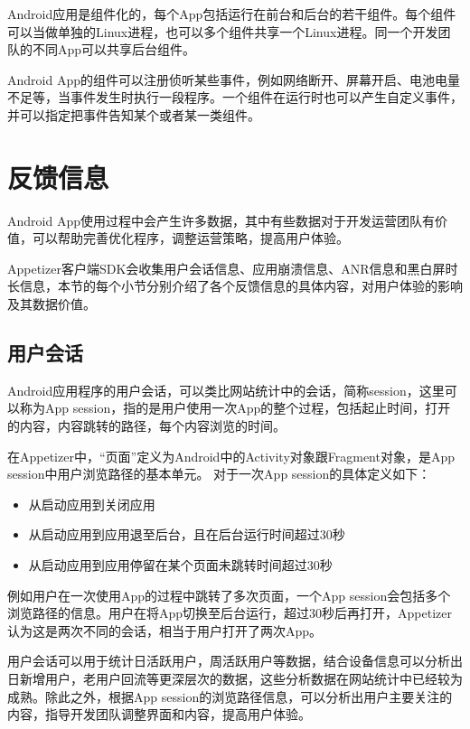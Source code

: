 Android应用是组件化的，每个App包括运行在前台和后台的若干组件。每个组件可以当做单独的Linux进程，也可以多个组件共享一个Linux进程。同一个开发团队的不同App可以共享后台组件。

Android App的组件可以注册侦听某些事件，例如网络断开、屏幕开启、电池电量不足等，当事件发生时执行一段程序。一个组件在运行时也可以产生自定义事件，并可以指定把事件告知某个或者某一类组件。

\section{反馈信息}
\label{sec:replyInfo}

Android App使用过程中会产生许多数据，其中有些数据对于开发运营团队有价值，可以帮助完善优化程序，调整运营策略，提高用户体验。

Appetizer客户端SDK会收集用户会话信息、应用崩溃信息、ANR信息和黑白屏时长信息，本节的每个小节分别介绍了各个反馈信息的具体内容，对用户体验的影响及其数据价值。

\subsection{用户会话}

Android应用程序的用户会话，可以类比网站统计中的会话，简称session，这里可以称为App session，指的是用户使用一次App的整个过程，包括起止时间，打开的内容，内容跳转的路径，每个内容浏览的时间。

在Appetizer中，“页面”定义为Android中的Activity对象跟Fragment对象，是App session中用户浏览路径的基本单元。
对于一次App session的具体定义如下：

\begin{itemize}
	\item 从启动应用到关闭应用
	\item 从启动应用到应用退至后台，且在后台运行时间超过30秒
	\item 从启动应用到应用停留在某个页面未跳转时间超过30秒
\end{itemize}

例如用户在一次使用App的过程中跳转了多次页面，一个App session会包括多个浏览路径的信息。用户在将App切换至后台运行，超过30秒后再打开，Appetizer认为这是两次不同的会话，相当于用户打开了两次App。

用户会话可以用于统计日活跃用户，周活跃用户等数据，结合设备信息可以分析出日新增用户，老用户回流等更深层次的数据，这些分析数据在网站统计中已经较为成熟。除此之外，根据App session的浏览路径信息，可以分析出用户主要关注的内容，指导开发团队调整界面和内容，提高用户体验。

